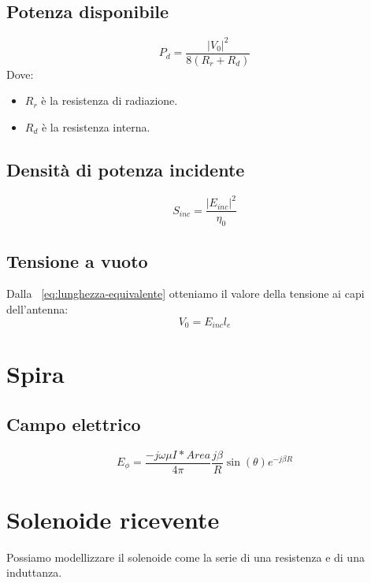 			\subsection{Potenza disponibile}			
				\begin{equation}
						P_d=\frac{|V_0|^2}{8(R_r+R_d)}
				\end{equation}
			Dove:

			\begin{itemize}
			\item $R_r$ è la resistenza di radiazione.
			\item $R_d$ è la resistenza interna.
			\end{itemize}
			
			\subsection{Densità di potenza incidente}

			\begin{equation}
			S_{inc}=\frac{|E_{inc}|^2}{\eta_0}	
			\end{equation}

			\subsection{Tensione a vuoto}			
				Dalla ~\ref{eq:lunghezza-equivalente} otteniamo il valore della tensione ai capi dell'antenna:
				\begin{equation}
				V_0=E_{inc}l_e
				\end{equation}

		\section{Spira}

			\subsection{Campo elettrico}

				\begin{equation}
				E_\phi=\frac{-j\omega\mu I*Area}{4\pi}\frac{j\beta}{R}\sin(\theta)e^{-j\beta R}
				\end{equation}

		\section{Solenoide ricevente}
			
			Possiamo modellizzare il solenoide come la serie di una resistenza e di una induttanza.

